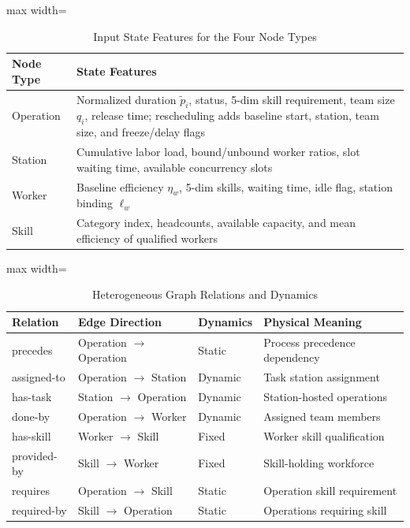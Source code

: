\documentclass[journal,10pt]{IEEEtran}
\renewcommand{\arraystretch}{1.06}
\begin{document}
\begin{table}[!t]
\centering
\caption{Input State Features for the Four Node Types}
\label{tab:node_features}
\setlength{\tabcolsep}{3pt}
\renewcommand{\arraystretch}{1.05}
\begin{adjustbox}{max width=\columnwidth}
\begin{tabular}{@{}lp{6.8cm}@{}}
\toprule
\textbf{Node Type} & \textbf{State Features} \\
\midrule
Operation & Normalized duration $\widetilde p_i$, status, 5-dim skill requirement, team size $q_i$, release time; rescheduling adds baseline start, station, team size, and freeze/delay flags \\
Station & Cumulative labor load, bound/unbound worker ratios, slot waiting time, available concurrency slots \\
Worker & Baseline efficiency $\eta_w$, 5-dim skills, waiting time, idle flag, station binding $\ell_w$ \\
Skill & Category index, headcounts, available capacity, and mean efficiency of qualified workers \\
\bottomrule
\end{tabular}
\end{adjustbox}
\vspace{2pt}
\par{}\par
\end{table}

\begin{table}[!t]
\centering
\caption{Heterogeneous Graph Relations and Dynamics}
\label{tab:relations}
\setlength{\tabcolsep}{3pt}
\renewcommand{\arraystretch}{1.05}
\begin{adjustbox}{max width=\columnwidth}
\begin{tabular}{@{}llll@{}}
\toprule
\textbf{Relation} & \textbf{Edge Direction} & \textbf{Dynamics} & \textbf{Physical Meaning} \\
\midrule
precedes & Operation $\rightarrow$ Operation & Static & Process precedence dependency \\
assigned-to & Operation $\rightarrow$ Station & Dynamic & Task station assignment \\
has-task & Station $\rightarrow$ Operation & Dynamic & Station-hosted operations \\
done-by & Operation $\rightarrow$ Worker & Dynamic & Assigned team members \\
has-skill & Worker $\rightarrow$ Skill & Fixed & Worker skill qualification \\
provided-by & Skill $\rightarrow$ Worker & Fixed & Skill-holding workforce \\
requires & Operation $\rightarrow$ Skill & Static & Operation skill requirement \\
required-by & Skill $\rightarrow$ Operation & Static & Operations requiring skill \\
\bottomrule
\end{tabular}
\end{adjustbox}
\end{table}
\end{document}
